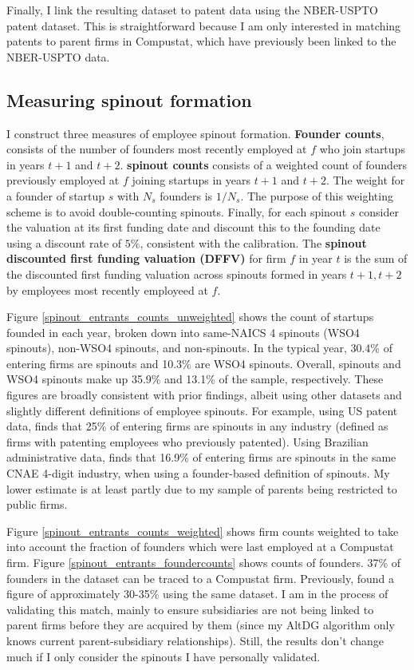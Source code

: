 \documentclass[12pt,english]{article}
\theoremstyle{remark}
\begin{document}
Finally, I link the resulting dataset to patent data using the NBER-USPTO patent dataset. This is straightforward because I am only interested in matching patents to parent firms in Compustat, which have previously been linked to the NBER-USPTO data.

\subsection{Measuring spinout formation}

I construct three measures of employee spinout formation. \textbf{Founder counts}, consists of the number of founders most recently employed at $f$ who join startups in years $t+1$ and $t+2$. \textbf{spinout counts} consists of a weighted count of founders previously employed at $f$ joining startups in years $t+1$ and $t+2$. The weight for a founder of startup $s$ with $N_s$ founders is $1/N_s$. The purpose of this weighting scheme is to avoid double-counting spinouts. Finally, for each spinout $s$ consider the valuation at its first funding date and discount this to the founding date using a discount rate of $5\%$, consistent with the calibration. The \textbf{spinout discounted first funding valuation (DFFV)} for firm $f$ in year $t$ is the sum of the discounted first funding valuation across spinouts formed in years $t+1,t+2$ by employees most recently employeed at $f$. 

Figure \ref{spinout_entrants_counts_unweighted} shows the count of startups founded in each year, broken down into same-NAICS 4 spinouts (WSO4 spinouts), non-WSO4 spinouts, and non-spinouts. In the typical year, 30.4\% of entering firms are spinouts and 10.3\% are WSO4 spinouts. Overall, spinouts and WSO4 spinouts make up 35.9\% and 13.1\% of the sample, respectively. These figures are broadly consistent with prior findings, albeit using other datasets and slightly different definitions of employee spinouts. For example, using US patent data, \cite{baslandze_spinout_2019} finds that 25\% of entering firms are spinouts in any industry (defined as firms with patenting employees who previously patented). Using Brazilian administrative data, \cite{muendler_employee_2012} finds that 16.9\% of entering firms are spinouts in the same CNAE 4-digit industry, when using a founder-based definition of spinouts. My lower estimate is at least partly due to my sample of parents being restricted to public firms. 

Figure \ref{spinout_entrants_counts_weighted} shows firm counts weighted to take into account the fraction of founders which were last employed at a Compustat firm. Figure \ref{spinout_entrants_foundercounts} shows counts of founders. 37\% of founders in the dataset can be traced to a Compustat firm. Previously, \cite{gompers_entrepreneurial_2005} found a figure of approximately 30-35\% using the same dataset. I am in the process of validating this match, mainly to ensure subsidiaries are not being linked to parent firms before they are acquired by them (since my AltDG algorithm only knows current parent-subsidiary relationships). Still, the results don't change much if I only consider the spinouts I have personally validated.
\end{document}

